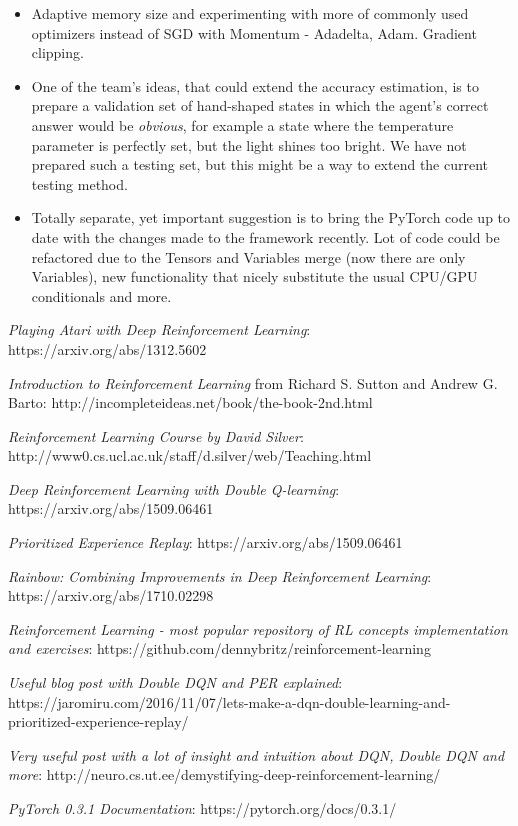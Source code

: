 \documentclass{article}
\begin{document}
\begin{itemize}
\item Adaptive memory size and experimenting with more of commonly used optimizers instead of SGD with Momentum - Adadelta, Adam. Gradient clipping. 

\item One of the team's ideas, that could extend the accuracy estimation, is to prepare a validation set of hand-shaped states in which the agent's correct answer would be \textit{obvious}, for example a state where the temperature parameter is perfectly set, but the light shines too bright. We have not prepared such a testing set, but this might be a way to extend the current testing method.

\item Totally separate, yet important suggestion is to bring the PyTorch code up to date with the changes made to the framework recently. Lot of code could be refactored due to the Tensors and Variables merge (now there are only Variables), new functionality that nicely substitute the usual CPU/GPU conditionals and more. 

\end{itemize}
\newpage

\begin{thebibliography}{99}

  \textit{Playing Atari with Deep Reinforcement Learning}: https://arxiv.org/abs/1312.5602

  
  \textit{Introduction to Reinforcement Learning} from
  Richard S. Sutton and Andrew G. Barto: http://incompleteideas.net/book/the-book-2nd.html

  \textit{Reinforcement Learning Course by David Silver}:
  http://www0.cs.ucl.ac.uk/staff/d.silver/web/Teaching.html 

  \textit{Deep Reinforcement Learning with Double Q-learning}: https://arxiv.org/abs/1509.06461
  
	\textit{Prioritized Experience Replay}: https://arxiv.org/abs/1509.06461
	
  \textit{Rainbow: Combining Improvements in Deep Reinforcement Learning}: https://arxiv.org/abs/1710.02298
	
	\textit{Reinforcement Learning - most popular repository of RL concepts implementation and exercises}: https://github.com/dennybritz/reinforcement-learning

	\textit{Useful blog post with Double DQN and PER explained}: 
	https://jaromiru.com/2016/11/07/lets-make-a-dqn-double-learning-and-prioritized-experience-replay/

	\textit{Very useful post with a lot of insight and intuition about DQN, Double DQN and more}: http://neuro.cs.ut.ee/demystifying-deep-reinforcement-learning/
	
	\textit{PyTorch 0.3.1 Documentation}: https://pytorch.org/docs/0.3.1/

\end{thebibliography}
\end{document}

